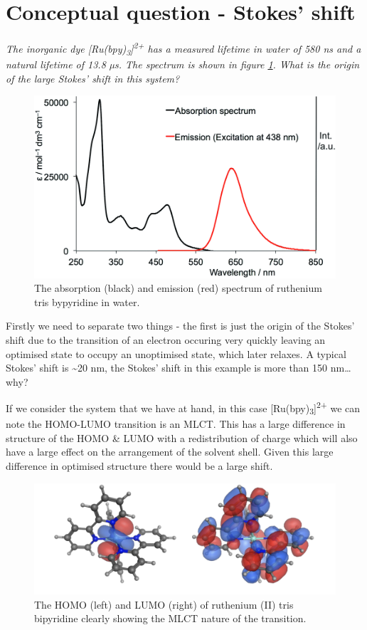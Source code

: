 \documentclass[
]{book}
\begin{document}
\hypertarget{sec:stokes}{%
\section{Conceptual question - Stokes' shift}\label{sec:stokes}}

\emph{The inorganic dye {[}Ru(bpy)\textsubscript{3}{]}\textsuperscript{2+} has a measured lifetime in water of 580 ns and a natural lifetime of 13.8 µs. The spectrum is shown in figure \ref{fig:Rubpyspec}. What is the origin of the large Stokes' shift in this system?}

\begin{figure}

{\centering \includegraphics[width=0.7\linewidth]{images/Rubpy3spectra} 

}

\caption{The absorption (black) and emission (red) spectrum of ruthenium tris bypyridine in water.}\label{fig:Rubpyspec}
\end{figure}

Firstly we need to separate two things - the first is just the origin of the Stokes' shift due to the transition of an electron occuring very quickly leaving an optimised state to occupy an unoptimised state, which later relaxes. A typical Stokes' shift is \textasciitilde20 nm, the Stokes' shift in this example is more than 150 nm\ldots{} why?

If we consider the system that we have at hand, in this case {[}Ru(bpy)\textsubscript{3}{]}\textsuperscript{2+} we can note the HOMO-LUMO transition is an MLCT. This has a large difference in structure of the HOMO \& LUMO with a redistribution of charge which will also have a large effect on the arrangement of the solvent shell. Given this large difference in optimised structure there would be a large shift.

\begin{figure}

{\centering \includegraphics[width=0.7\linewidth]{images/RubpyMLCT} 

}

\caption{The HOMO (left) and LUMO (right) of ruthenium (II) tris bipyridine clearly showing the MLCT nature of the transition.}\label{fig:RubpyMLCT}
\end{figure}
\end{document}
